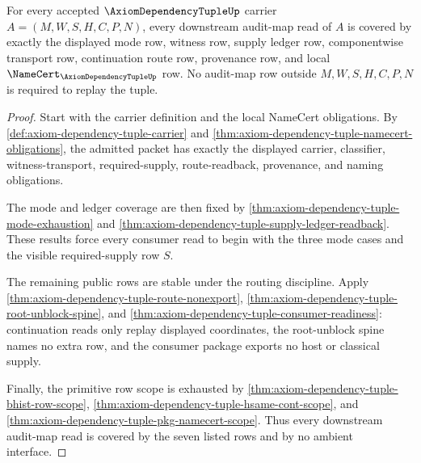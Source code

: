 \begin{theorem}
\label{thm:axiom-dependency-tuple-audit-map-row-coverage}
For every accepted $\AxiomDependencyTupleUp$ carrier
$A=(M,W,S,H,C,P,N)$, every downstream audit-map read of $A$ is covered by
exactly the displayed mode row, witness row, supply ledger row, componentwise
transport row, continuation route row, provenance row, and local
$\NameCert_{\AxiomDependencyTupleUp}$ row. No audit-map row outside
$M,W,S,H,C,P,N$ is required to replay the tuple.
\end{theorem}
\begin{proof}
Start with the carrier definition and the local NameCert obligations. By
\autoref{def:axiom-dependency-tuple-carrier} and
\autoref{thm:axiom-dependency-tuple-namecert-obligations}, the admitted packet
has exactly the displayed carrier, classifier, witness-transport,
required-supply, route-readback, provenance, and naming obligations.

The mode and ledger coverage are then fixed by
\autoref{thm:axiom-dependency-tuple-mode-exhaustion} and
\autoref{thm:axiom-dependency-tuple-supply-ledger-readback}. These results
force every consumer read to begin with the three mode cases and the visible
required-supply row $S$.

The remaining public rows are stable under the routing discipline. Apply
\autoref{thm:axiom-dependency-tuple-route-nonexport},
\autoref{thm:axiom-dependency-tuple-root-unblock-spine}, and
\autoref{thm:axiom-dependency-tuple-consumer-readiness}: continuation reads
only replay displayed coordinates, the root-unblock spine names no extra row,
and the consumer package exports no host or classical supply.

Finally, the primitive row scope is exhausted by
\autoref{thm:axiom-dependency-tuple-bhist-row-scope},
\autoref{thm:axiom-dependency-tuple-hsame-cont-scope}, and
\autoref{thm:axiom-dependency-tuple-pkg-namecert-scope}. Thus every
downstream audit-map read is covered by the seven listed rows and by no
ambient interface.
\end{proof}

